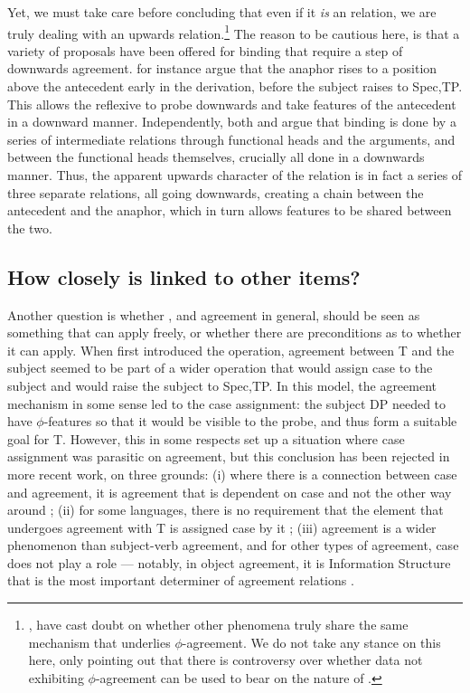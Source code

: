 \documentclass[output=paper
,modfonts
,nonflat]{langsci/langscibook}
\begin{document}
Yet, we must take care before concluding that even if it \emph{is} an {\agr} relation, we are truly dealing with an upwards {\agr} relation.\footnote{\citet{Preminger2013}, \citet{premingerpolinsky2015} have cast doubt on whether other phenomena truly share the same mechanism that underlies $\phi$-agreement.
	We do not take any stance on this here, only pointing out that there is controversy over whether data not exhibiting $\phi$-agreement can be used to bear on the nature of {\agr}.}
The reason to be cautious here, is that a variety of proposals have been offered for binding that require a step of downwards agreement.
\citet{rooryckvandenwyngaerd} for instance argue that the anaphor rises to a position above the antecedent early in the derivation, before the subject raises to Spec,TP.
This allows the reflexive to probe downwards and take features of the antecedent in a downward manner.
Independently, both \citet{reuland2001,reuland2011} and \citet{kratzer2009} argue that binding is done by a series of intermediate relations through functional heads and the arguments, and between the functional heads themselves, crucially all done in a downwards manner.
Thus, the apparent upwards character of the {\agr} relation is in fact a series of three separate {\agr} relations, all going downwards, creating a chain between the antecedent and the anaphor, which in turn allows features to be shared between the two.

\subsection{How closely is {\agr} linked to other items?}
\label{sec:parasitic}

Another question is whether {\agr}, and agreement in general, should be seen as something that can apply freely, or whether there are preconditions as to whether it can apply.
When \citet{Chomsky2000,Chomsky2001} first introduced the {\agr} operation, agreement between T and the subject seemed to be part of a wider operation that would assign case to the subject and would raise the subject to Spec,TP.
In this model, the agreement mechanism in some sense led to the case assignment: the subject DP needed to have $\phi$-features so that it would be visible to the probe, and thus form a suitable goal for T.
However, this in some respects set up a situation where case assignment was parasitic on agreement, but this conclusion has been rejected in more recent work, on three grounds: (i) where there is a connection between case and agreement, it is agreement that is dependent on case and not the other way around \citep{Bobaljik2008,preminger2011,preminger2015}; (ii) for some languages, there is no requirement that the element that undergoes agreement with T is assigned case by it \citep{baker2008}; (iii) agreement is a wider phenomenon than subject-verb agreement, and for other types of agreement, case does not play a role --- notably, in object agreement, it is Information Structure that is the most important determiner of agreement relations \citep{dn2011}.
\end{document}

